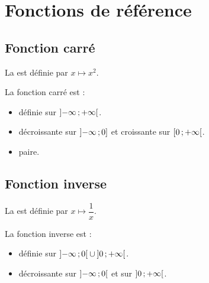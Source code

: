 \documentclass[12pt,a4paper]{article}
\begin{document}
	
	
	
	\section{Fonctions de référence}
	
	\subsection{Fonction carré}
	
	\begin{mydef}
		La  est définie par $x \mapsto x^2$.
	\end{mydef}
	
	\begin{myprops}
		La fonction carré est :
		\begin{itemize}
			\item définie sur $\mbox{\ensuremath{\left]- \infty \mathpunct{};+ \infty\right[}}$.
			\item décroissante sur $\mbox{\ensuremath{\left]- \infty\mathpunct{};0\right]}}$ et croissante sur $\mbox{\ensuremath{\left[0\mathpunct{};+ \infty\right[}}$.
			\item paire.
		\end{itemize}
		
	\end{myprops}
	
	
	
	
	\subsection{Fonction inverse}
	
	\begin{mydef}
		La  est définie par $x \mapsto \dfrac{1}{x}$.			
	\end{mydef}
	
	\begin{myprops}
		La fonction inverse est :
		\begin{itemize}
			\item définie sur $\mbox{\ensuremath{\left]-\infty\mathpunct{};0\right[}} \cup \mbox{\ensuremath{\left]0\mathpunct{};+\infty\right[}}$.
			\item décroissante sur $\mbox{\ensuremath{\left]- \infty\mathpunct{};0\right[}}$ et sur $\mbox{\ensuremath{\left]0\mathpunct{};+ \infty\right[}}$. 
		\end{itemize}
	\end{myprops}
	
\end{document}
